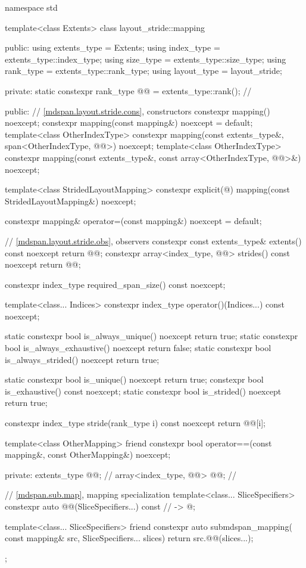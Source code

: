 \begin{codeblock}
namespace std {
  template<class Extents>
  class layout_stride::mapping {
  public:
    using extents_type = Extents;
    using index_type = extents_type::index_type;
    using size_type = extents_type::size_type;
    using rank_type = extents_type::rank_type;
    using layout_type = layout_stride;

  private:
    static constexpr rank_type @@ = extents_type::rank();    // \expos

  public:
    // \ref{mdspan.layout.stride.cons}, constructors
    constexpr mapping() noexcept;
    constexpr mapping(const mapping&) noexcept = default;
    template<class OtherIndexType>
      constexpr mapping(const extents_type&, span<OtherIndexType, @@>) noexcept;
    template<class OtherIndexType>
      constexpr mapping(const extents_type&, const array<OtherIndexType, @@>&) noexcept;

    template<class StridedLayoutMapping>
      constexpr explicit(@\seebelow@) mapping(const StridedLayoutMapping&) noexcept;

    constexpr mapping& operator=(const mapping&) noexcept = default;

    // \ref{mdspan.layout.stride.obs}, observers
    constexpr const extents_type& extents() const noexcept { return @@; }
    constexpr array<index_type, @@> strides() const noexcept { return @@; }

    constexpr index_type required_span_size() const noexcept;

    template<class... Indices>
      constexpr index_type operator()(Indices...) const noexcept;

    static constexpr bool is_always_unique() noexcept { return true; }
    static constexpr bool is_always_exhaustive() noexcept { return false; }
    static constexpr bool is_always_strided() noexcept { return true; }

    static constexpr bool is_unique() noexcept { return true; }
    constexpr bool is_exhaustive() const noexcept;
    static constexpr bool is_strided() noexcept { return true; }

    constexpr index_type stride(rank_type i) const noexcept { return @@[i]; }

    template<class OtherMapping>
      friend constexpr bool operator==(const mapping&, const OtherMapping&) noexcept;

  private:
    extents_type @@{};                    // \expos
    array<index_type, @@> @@{};        // \expos

    // \ref{mdspan.sub.map},  mapping specialization
    template<class... SliceSpecifiers>
      constexpr auto @@(SliceSpecifiers...) const       // \expos
        -> @\seebelow@;

    template<class... SliceSpecifiers>
      friend constexpr auto submdspan_mapping(
        const mapping& src, SliceSpecifiers... slices) {
          return src.@@(slices...);
      }
  };
}
\end{codeblock}

